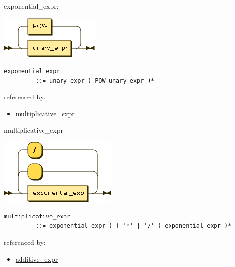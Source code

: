\begin{minipage}{\textwidth}
\protect\hypertarget{exponential_expr}{}{exponential\_expr:}

\includegraphics[width=1.93750in,height=0.83333in]{diagram/exponential_expr.png}

\begin{verbatim}
exponential_expr
         ::= unary_expr ( POW unary_expr )*
\end{verbatim}

referenced by:

\begin{itemize}
\tightlist
\item
  \protect\hyperlink{multiplicative_expr}{multiplicative\_expr}
\end{itemize}

\end{minipage}

\begin{minipage}{\textwidth}
\protect\hypertarget{multiplicative_expr}{}{multiplicative\_expr:}

\includegraphics[width=2.29167in,height=1.29167in]{diagram/multiplicative_expr.png}

\begin{verbatim}
multiplicative_expr
         ::= exponential_expr ( ( '*' | '/' ) exponential_expr )*
\end{verbatim}

referenced by:

\begin{itemize}
\tightlist
\item
  \protect\hyperlink{additive_expr}{additive\_expr}
\end{itemize}

\end{minipage}

